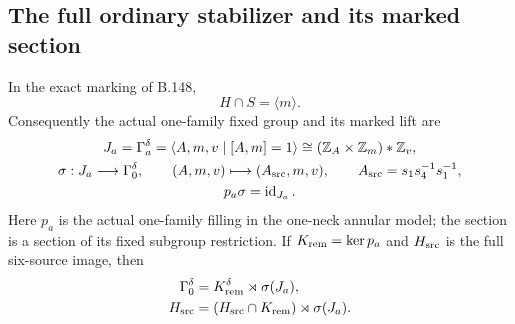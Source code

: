 \subsection*{The full ordinary stabilizer and its marked section}
\label{stmt:B149}
In the exact marking of B.148,
\[
 H\cap S=\langle m\rangle.
\]
Consequently the actual one-family fixed group and its marked lift are
\begin{equation}\label{eq:B149-section}
\begin{gathered}
 J_a=\Gamma_a^\delta
   =\langle A,m,v\mid[A,m]=1\rangle
   \cong(\mathbb Z_A\times\mathbb Z_m)*\mathbb Z_v,\\
 \sigma:J_a\longrightarrow\Gamma_0^\delta,
 \qquad(A,m,v)\longmapsto(A_{\rm src},m,v),\qquad
 A_{\rm src}=s_1s_4^{-1}s_1^{-1},\\
 p_a\sigma=\operatorname{id}_{J_a}.
\end{gathered}
\end{equation}
Here $p_a$ is the actual one-family filling in the one-neck annular
model; the section is a section of its fixed subgroup restriction.
If $K_{\rm rem}=\ker p_a$ and $H_{\rm src}$ is the full six-source
image, then
\begin{equation}\label{eq:B149-split}
\begin{aligned}
 \Gamma_0^\delta&=K_{\rm rem}^\delta\rtimes\sigma(J_a),\\
 H_{\rm src}&=(H_{\rm src}\cap K_{\rm rem})\rtimes\sigma(J_a).
\end{aligned}
\end{equation}
